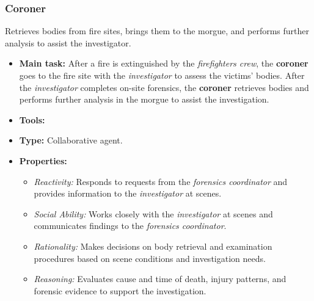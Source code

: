 \subsubsection{Coroner}
Retrieves bodies from fire sites, brings them to the morgue, and performs further analysis to assist the investigator.
\begin{itemize}
    \item \textbf{Main task:} After a fire is extinguished by the \textit{firefighters crew}, the \textbf{coroner} goes to the fire site with the \textit{investigator} to assess the victims' bodies. After the \textit{investigator} completes on-site forensics, the \textbf{coroner} retrieves bodies and performs further analysis in the morgue to assist the investigation.
    \item \textbf{Tools:}
    \item \textbf{Type:} Collaborative agent.
    \item \textbf{Properties:}
    \begin{itemize}
        \item \textit{Reactivity:} Responds to requests from the \textit{forensics coordinator} and provides information to the \textit{investigator} at scenes.
        \item \textit{Social Ability:} Works closely with the \textit{investigator} at scenes and communicates findings to the \textit{forensics coordinator}.
        \item \textit{Rationality:} Makes decisions on body retrieval and examination procedures based on scene conditions and investigation needs.
        \item \textit{Reasoning:} Evaluates cause and time of death, injury patterns, and forensic evidence to support the investigation.
    \end{itemize}
\end{itemize}

